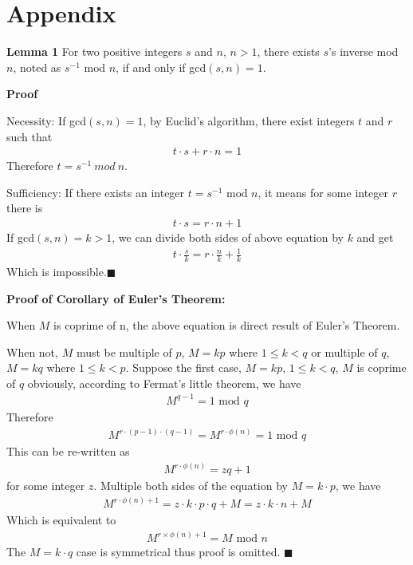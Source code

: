\documentclass[]{paper}
\begin{document}
\section*{Appendix}

\textbf{Lemma 1} For two positive integers $s$ and $n$, $n > 1$, there exists $s$'s inverse mod $n$, noted as $s^{-1}\text{ mod }n$, if and only if gcd$(s,n) = 1$. 

\textbf{Proof}

Necessity: If gcd$(s,n) = 1$, by Euclid's algorithm, there exist integers $t$ and $r$ such that
\begin{eqnarray*}
t\cdot s + r\cdot n = 1
\end{eqnarray*}
Therefore $t = s^{-1}\ mod\ n$.

Sufficiency: If there exists an integer $t = s^{-1}\text{ mod } n$, it means for some integer $r$ there is
\begin{eqnarray*}
t\cdot s = r\cdot n + 1
\end{eqnarray*}
If gcd$(s,n) = k > 1$, we can divide both sides of above equation by $k$ and get
\begin{eqnarray*}
t\cdot\frac{s}{k} = r\cdot\frac{n}{k} + \frac{1}{k}
\end{eqnarray*}
Which is impossible.$\blacksquare$

\textbf{Proof of Corollary of Euler's Theorem:}

When $M$ is coprime of n, the above equation is direct result of Euler's Theorem.

When not, $M$ must be multiple of $p$, $M = kp$ where $1 \le k < q$ or multiple of $q$, $M = kq$ where $1\le k < p$. Suppose the first case, $M = kp$, $1\le k < q$, $M$ is coprime of $q$ obviously, according to Fermat's little theorem, we have
\begin{eqnarray*}
	M^{q-1}= 1\text{ mod } q
\end{eqnarray*}
Therefore
\begin{eqnarray*}
	M^{r\cdot (p-1)\cdot (q-1)}= M^{r\cdot \phi(n)} = 1\text{ mod }q
\end{eqnarray*}
This can be re-written as
\begin{eqnarray*}
	M^{r\cdot \phi(n)} = zq + 1
\end{eqnarray*}
for some integer $z$. Multiple both sides of the equation by $M = k\cdot p$, we have
\begin{eqnarray*}
	M^{r\cdot \phi(n) + 1} = z\cdot k\cdot p\cdot q + M = z\cdot k\cdot n + M
\end{eqnarray*}
Which is equivalent to
\begin{eqnarray*}
	M^{r\times \phi(n) + 1} = M\text{ mod } n
\end{eqnarray*}
The $M = k\cdot q$ case is symmetrical thus proof is omitted. $\blacksquare$
\end{document}
